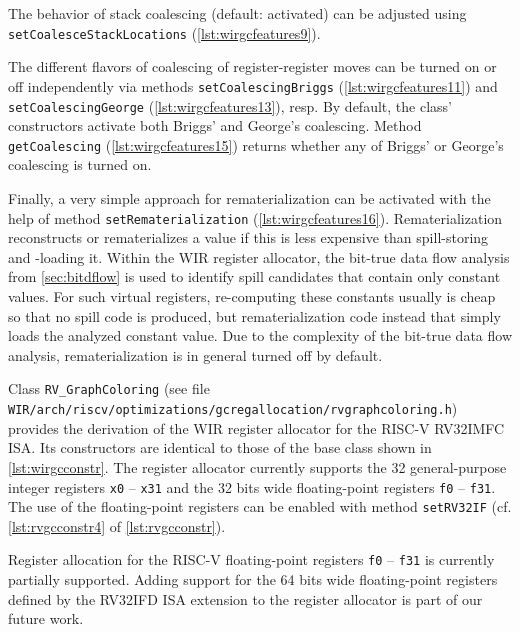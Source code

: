The behavior of stack coalescing (default: activated) can be adjusted using \texttt{setCoalesceStackLocations} (\cref{lst:wirgcfeatures9}).

The different flavors of coalescing of register-register moves can be turned on or off independently via methods \texttt{setCoalescingBriggs} (\cref{lst:wirgcfeatures11}) and \texttt{setCoalescingGeorge} (\cref{lst:wirgcfeatures13}), resp.
By default, the class' constructors activate both Briggs' and George's coalescing.
Method \texttt{getCoalescing} (\cref{lst:wirgcfeatures15}) returns whether any of Briggs' or George's coalescing is turned on.

Finally, a very simple approach for rematerialization can be activated with the help of method \texttt{setRemateriali\-zation} (\cref{lst:wirgcfeatures16}).
Rematerialization reconstructs or rematerializes a value if this is less expensive than spill-storing and -loading it.
Within the \gls{WIR} register allocator, the bit-true data flow analysis from \cref{sec:bitdflow} is used to identify spill candidates that contain only constant values.
For such virtual registers, re-computing these constants usually is cheap so that no spill code is produced, but rematerialization code instead that simply loads the analyzed constant value.
Due to the complexity of the bit-true data flow analysis, rematerialization is in general turned off by default.

Class \texttt{RV\_GraphColoring} (see file \texttt{WIR/arch/riscv/optimizations/gcregallocation/rvgraphcolor\-ing.h}) provides the derivation of the \gls{WIR} register allocator for the RISC-V RV32IMFC \gls{ISA}.
Its constructors are identical to those of the base class shown in \cref{lst:wirgcconstr}.
The register allocator currently supports the 32 general-purpose integer registers \texttt{x0} -- \texttt{x31} and the 32 bits wide floating-point registers \texttt{f0} -- \texttt{f31}.
The use of the floating-point registers can be enabled with method \texttt{setRV32IF} (cf. \cref{lst:rvgcconstr4} of \cref{lst:rvgcconstr}).

\begin{wirFutureWork}
Register allocation for the RISC-V floating-point registers \texttt{f0} -- \texttt{f31} is currently partially supported.
Adding support for the 64 bits wide floating-point registers defined by the RV32IFD \gls{ISA} extension to the register allocator is part of our future work.
\end{wirFutureWork}

